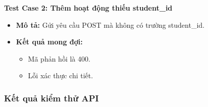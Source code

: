 \textbf{Test Case 2: Thêm hoạt động thiếu student\_id}
\begin{itemize}
    \item \textbf{Mô tả:} Gửi yêu cầu POST mà không có trường student\_id.
    \item \textbf{Kết quả mong đợi:}
    \begin{itemize}
        \item Mã phản hồi là 400.
        \item Lỗi xác thực chi tiết.
    \end{itemize}
\end{itemize}


\subsubsection{Kết quả kiểm thử API}
